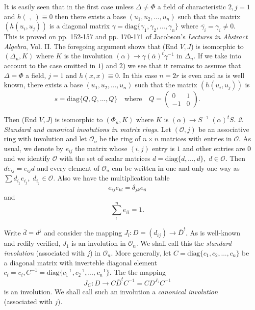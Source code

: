 \begin{enumerate}[I.]
It is easily seen that in the first case unless $\Delta\neq\Phi$ a field of characteristic $2, j=1$ and $h(\;,\;)\equiv 0$ then there exists a base $(u_1,u_2,\ldots,u_n)$ such that the matrix $(h(u_i,u_j))$ is a diagonal matrix $\gamma=\text{diag}\{\gamma_1,\gamma_2,\ldots,\gamma_n\}$ where $\overline{\gamma_i}=\gamma_i\neq 0$. This is proved on pp. 152-157 and pp. 170-171 of Jacobson's {\em Lectures in Abstract Algebra}, Vol. II. The foregoing argument shows that (End $V, J$) is isomorphic to $(\Delta_n, K)$ where $K$ is the involution $(\alpha)\to \gamma(\overline{\alpha})^{t}\gamma^{-1}$ in $\Delta_n$. If we take into account to the case omitted in $1$) and $2$) we see that it remains to assume that $\Delta=\Phi$ a field, $j=1$ and $h(x,x)\equiv0$. In this case $n=2r$ is even and as is well known, there exists a base $(u_1,u_2,\ldots,u_n)$ such that the matrix $(h(u_i, u_j))$ is 
\begin{equation*}
s=\text{diag}\{Q,Q,\ldots,Q\}\quad\text{where}\quad Q=\begin{pmatrix}
0 & 1\\
-1& 0
\end{pmatrix}.\tag{11} \label{c0:eq11}
\end{equation*}

Then (End $V, J$) is isomorphic to $(\Phi_n, K)$ where $K$ is
$(\alpha)\to S^{-1}$ $(\alpha)^{t}S$. 
\medskip
{\em 2. Standard and canonical involutions in matrix rings}. Let
$(\mathscr{O}, j)$ be an associative ring with involution and let
$\mathscr{O}_n$ be the ring of $n\times n$ matrices with entries in
$\mathscr{O}$. As usual, we denote by $e_{ij}$ the matrix whose
$(i,j)$ entry is $1$ and other entries are $0$ and we identify
$\mathscr{O}$ with the set of scalar matrices
$d=\text{diag}\{d,\ldots,d\},\; d\in \mathscr{O}$. Then
$de_{ij}=e_{ij}d$ and every element of $\mathscr{O}_n$ can be written
in one and only one way as $\sum d_{i_{j}}e_{i_{j}},\; d_{i_{j}}\in \mathscr{O}$. Also we have the multiplication table
\begin{equation*}
e_{ij}e_{kl}=\delta_{jk}e_{il}\tag{12}\label{c0:eq12}
\end{equation*}
and\pageoriginale
\begin{equation*}
\sum_{1}^{n}e_{ii}=1.\tag{13}\label{c0:eq13}
\end{equation*}

Write $\overline{d}=d^{j}$ and consider the mapping $J_l:D=(d_{ij})\to \overline{D}^{t}$. As is well-known and redily verified, $J_1$ is an involution in $\mathscr{O}_n$. We shall call this the {\em standard involution} (associated with $j$) in $\mathscr{O}_n$. More generally, let $C=\text{diag}\{c_1,c_2,\ldots,c_n\}$ be a diagonal matrix with inverteble diagonal element $c_i=\overline{c}_i, C^{-1}=\text{diag}\{c_1^{-1},c_2^{-1},\ldots,c_n^{-1}\}$. The the mapping
\begin{equation*}
J_C:D\to C \overline{D}^{t}C^{-1}=C D^{J_{1}}C^{-1}\tag{14}\label{c0:eq14}
\end{equation*}
is an involution. We shall call such an involution a {\em canonical involution} (associated with $j$).


\end{enumerate}
